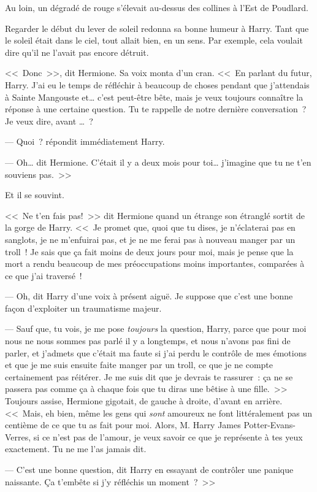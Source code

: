 Au loin, un dégradé de rouge s'élevait au-dessus des collines à l'Est de Poudlard.

Regarder le début du lever de soleil redonna sa bonne humeur à Harry. Tant que le soleil était dans le ciel, tout allait bien, en un sens. Par exemple, cela voulait dire qu'il ne l'avait pas encore détruit.

<<~Donc~>>, dit Hermione. Sa voix monta d'un cran. <<~En parlant du futur, Harry. J'ai eu le temps de réfléchir à beaucoup de choses pendant que j'attendais à Sainte Mangouste et… c'est peut-être bête, mais je veux toujours connaître la réponse à une certaine question. Tu te rappelle de notre dernière conversation~? Je veux dire, avant …~?

--- Quoi~? répondit immédiatement Harry.

--- Oh… dit Hermione. C'était il y a deux mois pour toi… j'imagine que tu ne t'en souviens pas.~>>

Et il se souvint.

<<~Ne t'en fais pas!~>> dit Hermione quand un étrange son étranglé sortit de la gorge de Harry. <<~Je promet que, quoi que tu dises, je n'éclaterai pas en sanglots, je ne m'enfuirai pas, et je ne me ferai pas à nouveau manger par un troll~! Je sais que ça fait moins de deux jours pour moi, mais je pense que la mort a rendu beaucoup de mes préoccupations moins importantes, comparées à ce que j'ai traversé~!

--- Oh, dit Harry d'une voix à présent aiguë. Je suppose que c'est une bonne façon d'exploiter un traumatisme majeur.

--- Sauf que, tu vois, je me pose \emph{toujours} la question, Harry, parce que pour moi nous ne nous sommes pas parlé il y a longtemps, et nous n'avons pas fini de parler, et j'admets que c'était ma faute si j'ai perdu le contrôle de mes émotions et que je me suis ensuite faite manger par un troll, ce que je ne compte certainement pas réitérer. Je me suis dit que je devrais te rassurer~: ça ne se passera pas comme ça à chaque fois que tu diras une bêtise à une fille.~>> Toujours assise, Hermione gigotait, de gauche à droite, d'avant en arrière. <<~Mais, eh bien, même les gens qui \emph{sont} amoureux ne font littéralement pas un centième de ce que tu as fait pour moi. Alors, M. Harry James Potter-Evans-Verres, si ce n'est pas de l'amour, je veux savoir ce que je représente à tes yeux exactement. Tu ne me l'as jamais dit.

--- C'est une bonne question, dit Harry en essayant de contrôler une panique naissante. Ça t'embête si j'y réfléchis un moment~?~>>

